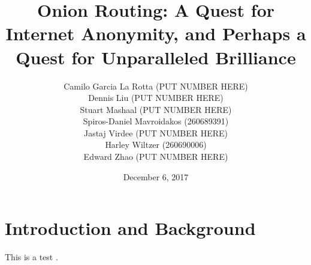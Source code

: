 \documentclass[10pt]{report}
\title{Onion Routing: A Quest for Internet Anonymity, and Perhaps a Quest for Unparalleled
Brilliance}
\author{Camilo Garcia La Rotta (PUT NUMBER HERE)\\Dennis Liu (PUT NUMBER HERE)\\Stuart
Mashaal (PUT NUMBER HERE)\\Spiros-Daniel
Mavroidakos (260689391)\\Jastaj Virdee (PUT NUMBER HERE)\\Harley Wiltzer (260690006)\\Edward Zhao
(PUT NUMBER HERE)}
\date{December 6, 2017}
\begin{document}
\maketitle
\tableofcontents
\doublespacing
\chapter{Introduction and Background}
This is a test \cite{HidingRoutingInformation}.


\end{document}
